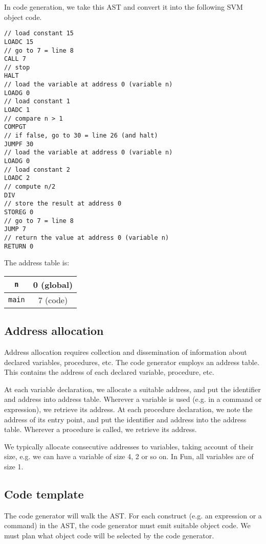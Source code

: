 \documentclass[a4paper, openany]{memoir}
\begin{document}
\noindent In code generation, we take this AST and convert it into the following SVM object code.
\begin{lstlisting}[language=SVM]
// load constant 15
LOADC 15
// go to 7 = line 8
CALL 7
// stop
HALT
// load the variable at address 0 (variable n)
LOADG 0
// load constant 1
LOADC 1
// compare n > 1
COMPGT
// if false, go to 30 = line 26 (and halt)
JUMPF 30
// load the variable at address 0 (variable n)
LOADG 0
// load constant 2
LOADC 2
// compute n/2
DIV
// store the result at address 0
STOREG 0
// go to 7 = line 8
JUMP 7
// return the value at address 0 (variable n)
RETURN 0
\end{lstlisting}
The address table is:
\begin{table}[H]
    \centering
    \begin{tabular}{|c|c|}
        \hline
        \texttt{n} & 0 (global) \\
        \hline
        \texttt{main} & 7 (code) \\
        \hline
    \end{tabular}
\end{table}

\subsection{Address allocation}
Address allocation requires collection and dissemination of information about declared variables, procedures, etc. The code generator employs an address table. This contains the address of each declared variable, procedure, etc.

At each variable declaration, we allocate a suitable address, and put the identifier and address into address table. Wherever a variable is used (e.g. in a command or expression), we retrieve its address. At each procedure declaration, we note the address of its entry point, and put the identifier and address into the address table. Wherever a procedure is called, we retrieve its address.

We typically allocate consecutive addresses to variables, taking account of their size, e.g. we can have a variable of size 4, 2 or so on. In Fun, all variables are of size 1.

\subsection{Code template}
The code generator will walk the AST. For each construct (e.g. an expression or a command) in the AST, the code generator must emit suitable object code. We must plan what object code will be selected by the code generator.
\end{document}
